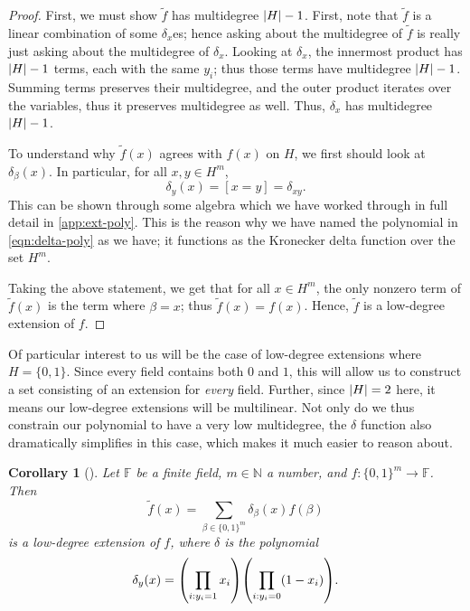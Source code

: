\documentclass[english,12pt]{reedthesis}
\theoremstyle{plain}
\newtheorem{cor}[cor]{Corollary}
\theoremstyle{definition}
\theoremstyle{remark}
\DeclarePairedDelimiter{\abs}{\lvert}{\rvert}
\begin{document}
\begin{proof}
  First, we must show $\tilde{f}$ has multidegree $\abs{H} - 1$. First, note
  that $\tilde{f}$ is a linear combination of some $\delta_{x}$es; hence asking about
  the multidegree of $\tilde{f}$ is really just asking about the multidegree of
  $\delta_{x}$. Looking at $\delta_{x}$, the innermost product has $\abs{H} - 1$ terms,
  each with the same $y_{i}$; thus those terms have multidegree $\abs{H} - 1$.
  Summing terms preserves their multidegree, and the outer product iterates over
  the variables, thus it preserves multidegree as well. Thus, $\delta_{x}$ has
  multidegree $\abs{H} - 1$.

  To understand why $\tilde{f}(x)$ agrees with $f(x)$ on $H$, we first should
  look at $\delta_{\beta}(x)$. In particular, for all $x, y \in H^{m}$,
  \begin{equation}\label{eqn:delta-is-delta}
    \delta_{y}(x) = [x = y] = \delta_{xy}.
  \end{equation}
  This can be shown through some algebra which we have worked through in full
  detail in \cref{app:ext-poly}. This is the reason why we have named the
  polynomial in \cref{eqn:delta-poly} as we have; it functions as the Kronecker
  delta function over the set $H^{m}$.

  Taking the above statement, we get that for all $x \in H^{m}$, the only nonzero
  term of $\tilde{f}(x)$ is the term where $\beta = x$; thus $\tilde{f}(x) = f(x)$.
  Hence, $\tilde{f}$ is a low-degree extension of $f$.
\end{proof}

Of particular interest to us will be the case of low-degree extensions where
$H = \{0, 1\}$. Since every field contains both $0$ and $1$, this will allow us
to construct a set consisting of an extension for \emph{every} field. Further,
since $\abs{H} = 2$ here, it means our low-degree extensions will be
multilinear. Not only do we thus constrain our polynomial to have a very low
multidegree, the $\delta$ function also dramatically simplifies in this case, which
makes it much easier to reason about.

\begin{cor}[{\cite[]{AW09}}]\label{cor:low-degree-boolean}
  Let $\mathbb{F}$ be a finite field, $m \in \mathbb{N}$ a number, and
  $f\colon \{0, 1\}^{m} \rightarrow \mathbb{F}$. Then
  \begin{equation}\label{eqn:low-deg-ext-small}
    \tilde{f}(x) = \sum_{\beta \in \{0, 1\}^{m}}\delta_{\beta}(x)f(\beta)
  \end{equation}
  is a low-degree extension of $f$, where $\delta$ is the polynomial
  \begin{equation}\label{eqn:delta-poly-small}
    \delta_{y}(x) = \mleft(\prod_{i:y_{i}=1}x_{i}\mright)\mleft(\prod_{i:y_{i}=0}(1 - x_{i})\mright).
  \end{equation}
\end{cor}
\end{document}
